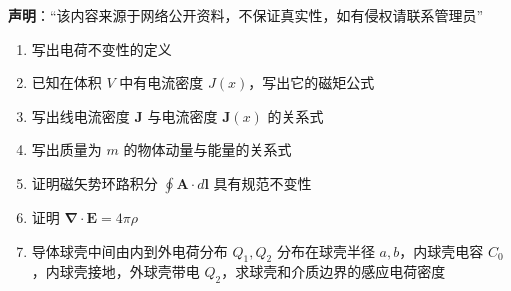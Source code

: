 

\textbf{声明}：“该内容来源于网络公开资料，不保证真实性，如有侵权请联系管理员”



\begin{enumerate}
    \item 写出电荷不变性的定义
    \item 已知在体积 $V$ 中有电流密度 $J(x)$，写出它的磁矩公式
    \item 写出线电流密度 $\mathbf{J}$ 与电流密度 $\mathbf{J}(x)$ 的关系式
    \item 写出质量为 $m$ 的物体动量与能量的关系式
    \item 证明磁矢势环路积分 $\oint \mathbf{A} \cdot d\mathbf{l}$ 具有规范不变性
    \item 证明 $\mathbf{\nabla} \cdot \mathbf{E} = 4 \pi \rho$
    \item 导体球壳中间由内到外电荷分布 $Q_1, Q_2$ 分布在球壳半径 $a, b$，内球壳电容 $C_0$，内球壳接地，外球壳带电 $Q_2$，求球壳和介质边界的感应电荷密度
\end{enumerate}


